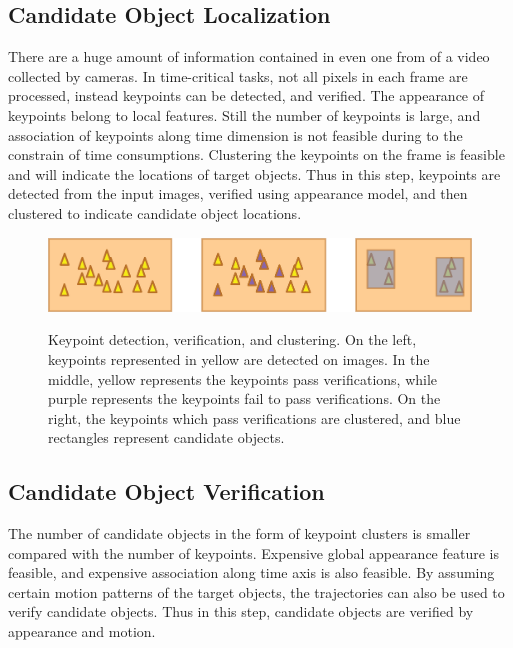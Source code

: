 \subsection{Candidate Object Localization}
There are a huge amount of information contained in even one from of a video collected by cameras. In time-critical tasks, not all pixels in each frame are processed, instead keypoints can be detected, and verified. The appearance of keypoints belong to local features. Still the number of keypoints is large, and association of keypoints along time dimension is not feasible during to the constrain of time consumptions. Clustering the keypoints on the frame is feasible and will indicate the locations of target objects. Thus in this step, keypoints are detected from the input images, verified using appearance model, and then clustered to indicate candidate object locations.

\begin{figure}
\centering
{
  \includegraphics[width=1\textwidth]{add1.eps}
}
\caption[Candidate object localization]{Keypoint detection, verification, and clustering. On the left, keypoints represented in yellow are detected on images. In the middle, yellow represents the keypoints pass verifications, while purple represents the keypoints fail to pass verifications. On the right, the keypoints which pass verifications are clustered, and blue rectangles represent candidate objects.}
\label{ord:add1}
\end{figure}
\subsection{Candidate Object Verification}
The number of candidate objects in the form of keypoint clusters is smaller compared with the number of keypoints. Expensive global appearance feature is feasible, and expensive association along time axis is also feasible. By assuming certain motion patterns of the target objects, the trajectories can also be used to verify candidate objects. Thus in this step, candidate objects are verified by appearance and motion.

